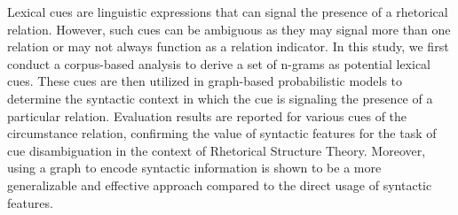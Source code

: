 Lexical cues are linguistic expressions that can signal the presence of a rhetorical relation. However, such cues can be ambiguous as they may signal more than one relation or may not always function as a relation indicator. In this study, we first conduct a corpus-based analysis to derive a set of n-grams as potential lexical cues. These cues are then utilized in graph-based probabilistic models to determine the syntactic context in which the cue is signaling the presence of a particular relation. Evaluation results are reported for various cues of the circumstance relation, confirming the value of syntactic features for the task of cue disambiguation in the context of Rhetorical Structure Theory. Moreover, using a graph to encode syntactic information is shown to be a more generalizable and effective approach compared to the direct usage of syntactic features.
